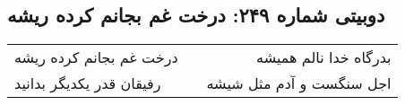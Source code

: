 \begin{center}
\section*{دوبیتی شماره ۲۴۹: درخت غم بجانم کرده ریشه}
\label{sec:249}
\begin{longtable}{l p{0.5cm} r}
درخت غم بجانم کرده ریشه
&&
بدرگاه خدا نالم همیشه
\\
رفیقان قدر یکدیگر بدانید
&&
اجل سنگست و آدم مثل شیشه
\\
\end{longtable}
\end{center}
